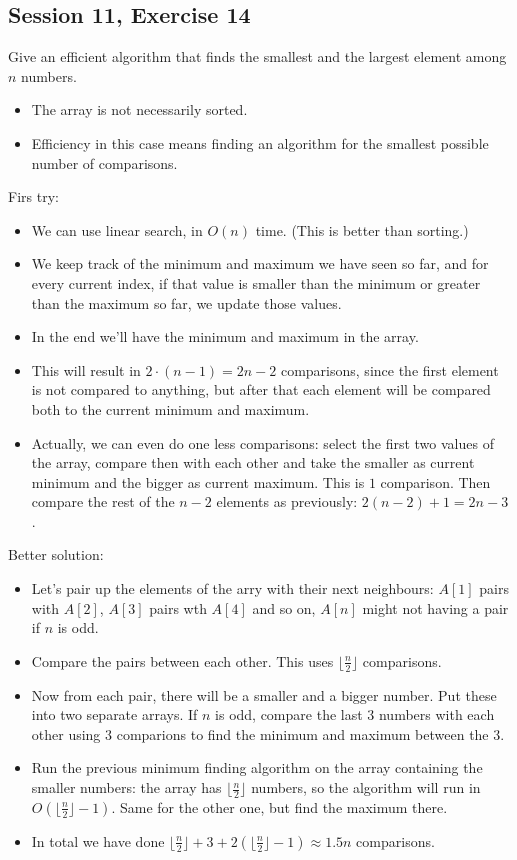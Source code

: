\subsection {Session 11, Exercise 14}


Give an efficient algorithm that finds the smallest and the largest element among $n$ numbers.


\begin{itemize}
    \item The array is not necessarily sorted.
    \item Efficiency in this case means finding an algorithm for the smallest possible number of comparisons.
\end{itemize}

Firs try:
\begin{itemize}
    \item We can use linear search, in $O(n)$ time. (This is better than sorting.)
    \item We keep track of the minimum and maximum we have seen so far, and for every current index, if that value is smaller than the minimum or greater than the maximum so far, we update those values.
    \item In the end we'll have the minimum and maximum in the array.
    \item This will result in $2\cdot{}(n-1)=2n-2$ comparisons, since the first element is not compared to anything, but after that each element will be compared both to the current minimum and maximum.
    \item Actually, we can even do one less comparisons: select the first two values of the array, compare then with each other and take the smaller as current minimum and the bigger as current maximum. This is $1$ comparison. Then compare the rest of the $n-2$ elements as previously: $2(n-2)+1 = 2n-3$.
\end{itemize}

Better solution:
\begin{itemize}
    \item Let's pair up the elements of the arry with their next neighbours: $A[1]$ pairs with $A[2]$, $A[3]$ pairs wth $A[4]$ and so on, $A[n]$ might not having a pair if $n$ is odd.
    \item Compare the pairs between each other. This uses $\lfloor{}\frac{n}{2}\rfloor{}$ comparisons.
    \item Now from each pair, there will be a smaller and a bigger number. Put these into two separate arrays. If $n$ is odd, compare the last $3$ numbers with each other using $3$ comparions to find the minimum and maximum between the $3$.
    \item Run the previous minimum finding algorithm on the array containing the smaller numbers: the array has $\lfloor{}\frac{n}{2}\rfloor{}$ numbers, so the algorithm will run in $O(\lfloor{}\frac{n}{2}\rfloor{}-1)$. Same for the other one, but find the maximum there.
    \item In total we have done $\lfloor{}\frac{n}{2}\rfloor{} + 3 + 2(\lfloor{}\frac{n}{2}\rfloor{} - 1) \approx{} 1.5n$ comparisons.
\end{itemize}